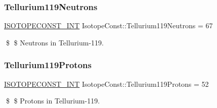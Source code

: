 \subsubsection{\texorpdfstring{Tellurium119\+Neutrons}{Tellurium119Neutrons}}
{\footnotesize\ttfamily \mbox{\hyperlink{group___isotope_const-_macros_ga5f18360b3e99483a35c32d789e62621c}{I\+S\+O\+T\+O\+P\+E\+C\+O\+N\+S\+T\+\_\+\+I\+NT}} Isotope\+Const\+::\+Tellurium119\+Neutrons = 67}

\$ \$ Neutrons in Tellurium-\/119. \mbox{\label{group___isotope_const-_tellurium-_te119_ga47827db0bab6b040aa692fbca4623a35}} 
\subsubsection{\texorpdfstring{Tellurium119\+Protons}{Tellurium119Protons}}
{\footnotesize\ttfamily \mbox{\hyperlink{group___isotope_const-_macros_ga5f18360b3e99483a35c32d789e62621c}{I\+S\+O\+T\+O\+P\+E\+C\+O\+N\+S\+T\+\_\+\+I\+NT}} Isotope\+Const\+::\+Tellurium119\+Protons = 52}

\$ \$ Protons in Tellurium-\/119. 